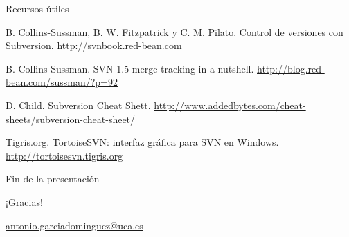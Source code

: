 \documentclass[xcolor=svgnames]{beamer}
\begin{document}
\appendix

\begin{frame}{Recursos útiles}

  \begin{thebibliography}{99}
    \beamertemplatebookbibitems
     B. Collins-Sussman, B. W. Fitzpatrick y C. M. Pilato.
      \newblock Control de versiones con Subversion.
      \newblock \url{http://svnbook.red-bean.com}

    \beamertemplatearticlebibitems
     B. Collins-Sussman.
      \newblock SVN 1.5 merge tracking in a nutshell.
      \newblock \url{http://blog.red-bean.com/sussman/?p=92}

     D. Child.
      \newblock Subversion Cheat Shett.
      \newblock \url{http://www.addedbytes.com/cheat-sheets/subversion-cheat-sheet/}

     Tigris.org.
      \newblock TortoiseSVN: interfaz gráfica para SVN en Windows.
      \newblock \url{http://tortoisesvn.tigris.org}
  \end{thebibliography}
  
\end{frame}

\begin{frame}{Fin de la presentación}
  \begin{center}
    {\Huge ¡Gracias!}

    \vspace{3em}

    {\Large
      \href{mailto:antonio.garciadominguez@uca.es}{antonio.garciadominguez@uca.es}}
  \end{center}
\end{frame}
\end{document}

